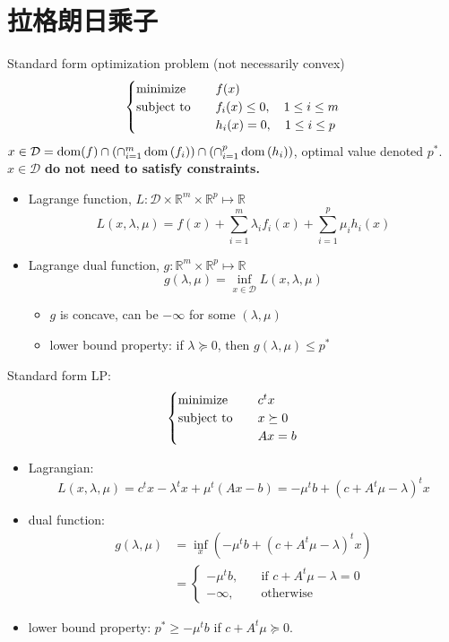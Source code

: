 \section{拉格朗日乘子}
\begin{remark}
    Standard form optimization problem (not necessarily convex)\[\begin{cases}
        \operatorname{minimize} \quad &f(x)\\
        \operatorname{subject\ to} \quad &f_i(x) \le 0, \quad 1 \le i \le m\\
        &h_i(x) = 0, \quad 1 \le i \le p
    \end{cases}\]
    $x \in \mathcal{D} =\operatorname{dom}(f) \cap\left(\cap_{i=1}^{m} \operatorname{dom}\left(f_{i}\right)\right) \cap\left(\cap_{i=1}^{p} \operatorname{dom}\left(h_{i}\right)\right)$, optimal value denoted $p^*$. $x \in \mathcal{D}$ \textbf{do not need to satisfy constraints.}
    \begin{itemize}
        \item Lagrange function, $L: \mathcal{D} \times \mathbb{R}^m \times \mathbb{R}^p \mapsto \mathbb{R}$ \[L(x, \lambda, \mu) = f(x) + \sum_{i = 1}^m\lambda_if_i(x) + \sum_{i = 1}^p \mu_ih_i(x)\]
        \item Lagrange dual function, $g: \mathbb{R}^m \times \mathbb{R}^p \mapsto \mathbb{R}$ \[g(\lambda, \mu) = \inf_{x \in \mathcal{D}} L(x, \lambda, \mu)\]\begin{itemize}
            \item $g$ is concave, can be $-\infty$ for some $(\lambda, \mu)$
            \item lower bound property: if $\lambda \succeq 0$, then $g(\lambda, \mu) \le p^*$
        \end{itemize}
    \end{itemize}
\end{remark}

\begin{remark}
    Standard form LP: \[\begin{cases}
        \operatorname{minimize} \quad & c^tx\\
        \operatorname{subject\ to} \quad & x \succeq 0\\
        & Ax = b
    \end{cases}\]
    \begin{itemize}
        \item Lagrangian: \[L(x, \lambda, \mu) = c^tx - \lambda^t x + \mu^t(Ax - b) = -\mu^tb + (c + A^t\mu - \lambda)^tx\]
        \item dual function: \begin{align*}
            g(\lambda, \mu) &= \inf_{x} \left(-\mu^tb + (c + A^t\mu - \lambda)^tx\right)\\
            &= \begin{cases}
                -\mu^tb, \quad &\text{if } c + A^t\mu - \lambda = 0\\
                -\infty, \quad &\text{otherwise}
            \end{cases}
        \end{align*}
        \item lower bound property: $p^* \ge -\mu^tb$ if $c + A^t\mu \succeq 0$.
    \end{itemize}
\end{remark}

